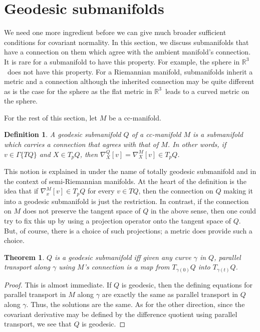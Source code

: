 \documentclass[11pt]{article}
\newtheorem{theorem}{Theorem}
\newtheorem{defn}{Definition}
\theoremstyle{remark}
\begin{document}
\section{Geodesic submanifolds}

We need one more ingredient before we can give much broader 
sufficient conditions
for covariant normality. In this section, we discuss submanifolds that
 have a connection on them which agree with the ambient manifold's
connection. It
is rare for a submanifold to have this property. For example, the
sphere in \ensuremath{\mathbb{R}^{3}}\ does not have this property. For a Riemannian manifold,
 submanifolds inherit a metric and a connection 
although the inherited connection may be quite different as is the
case  for the sphere as the 
flat metric in \ensuremath{\mathbb{R}^{3}}\ leads to a curved metric on the sphere. 


For the rest of this section, let $M$ be a cc-manifold. 


\begin{defn}
A \emph{geodesic submanifold} $Q$ of a cc-manifold $M$ is a
submanifold which carries a connection that agrees with that of $M$. 
In other words, if $v\in \ensuremath{\Gamma \{ TQ \}}$ and $X \in T_pQ$, then
$\ensuremath{{{\nabla}}_{X}^{Q}{[v]}} = \ensuremath{{{\nabla}}_{X}^{M}{[v]}} \in T_pQ$.
\end{defn}

This notion is
explained in \cite{On83} under the name of totally geodesic submanifold and
in the context of semi-Riemannian manifolds. 
At the heart of the definition is the idea that if $\ensuremath{{{\nabla}}_{x}^{M}{[v]}}
\in T_pQ$ for every $v \in TQ$, then the connection on $Q$ making it
into a geodesic submanifold is just the restriction. In contrast, if
the connection on $M$ does not preserve the tangent space of $Q$ in
the above sense, then one could try to fix this up by using a
projection operator onto the tangent space of $Q$. But, of course,
there is a choice of such projections; a metric does provide such a
choice. 

\begin{theorem}
$Q$ is a geodesic submanifold iff  given any curve $\gamma$ in $Q$, 
parallel transport along $\gamma$ using $M$'s connection is a map
from $T_{\gamma(0)}Q$ into $T_{\gamma(t)}Q$. 
\end{theorem}

\begin{proof}
This is almost immediate. If $Q$ is geodesic, then the defining equations for
parallel transport in $M$ along $\gamma$ are exactly the same as
parallel transport in $Q$ along $\gamma$. Thus, the solutions are the
same. As for the other direction, since the covariant derivative 
 may be defined by
the difference quotient using parallel transport, we see that $Q$ is
geodesic.     
\end{proof}
\end{document}
